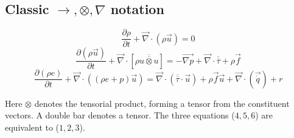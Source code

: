 \documentclass[12pt]{article}
\begin{document}
\subsection{Classic $\longrightarrow , \otimes , \nabla$ notation}
\begin{equation}
\frac{\partial \rho}{\partial t} + \overrightarrow{\nabla}\cdot(\rho\overrightarrow{u})=0 \end{equation}
\begin{equation}
\frac{\partial(\rho \overrightarrow{u})}{\partial t} + \overrightarrow{\nabla}\cdot[\rho\overline{\overline{u\otimes u}}] = -\overrightarrow{\nabla p} + \overrightarrow{\nabla}\cdot\overline{\overline{\tau}} + \rho\overrightarrow{f} \end{equation}
\begin{equation}
\frac{\partial(\rho e)}{\partial t} + \overrightarrow{\nabla}\cdot((\rho e + p)\overrightarrow{u}) = \overrightarrow{\nabla}\cdot(\overline{\overline{\tau}}\cdot\overrightarrow{u}) + \rho\overrightarrow{f}\overrightarrow{u} + \overrightarrow{\nabla}\cdot(\overrightarrow{\dot{q}})+r \end{equation}

Here $\otimes$ denotes the tensorial product, forming a tensor from the constituent vectors. A double bar denotes a tensor. The three equations ($4,5,6$) are equivalent to ($1,2,3$).
\end{document}
